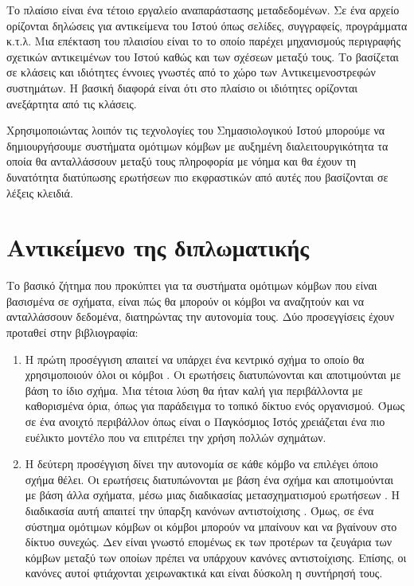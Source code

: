 Το πλαίσιο  είναι ένα τέτοιο εργαλείο αναπαράστασης
μεταδεδομένων. Σε ένα  αρχείο ορίζονται δηλώσεις για
αντικείμενα του Ιστού όπως σελίδες, συγγραφείς, προγράμματα κ.τ.λ.
Μια επέκταση του πλαισίου  είναι το  το
οποίο παρέχει μηχανισμούς περιγραφής σχετικών αντικειμένων του
Ιστού καθώς και των σχέσεων μεταξύ τους. Το 
βασίζεται σε κλάσεις και ιδιότητες έννοιες γνωστές από το χώρο των
Αντικειμενοστρεφών συστημάτων. Η βασική διαφορά είναι ότι στο
πλαίσιο  οι ιδιότητες ορίζονται ανεξάρτητα από τις
κλάσεις.

Χρησιμοποιώντας λοιπόν τις τεχνολογίες του Σημασιολογικού Ιστού
μπορούμε να δημιουργήσουμε συστήματα ομότιμων κόμβων με αυξημένη
διαλειτουργικότητα τα οποία θα ανταλλάσσουν μεταξύ τους πληροφορία
με νόημα και θα έχουν τη δυνατότητα διατύπωσης ερωτήσεων πιο
εκφραστικών από αυτές που βασίζονται σε λέξεις κλειδιά.


\section{Αντικείμενο της διπλωματικής}
Το βασικό ζήτημα που προκύπτει για τα συστήματα ομότιμων κόμβων
που είναι βασισμένα σε σχήματα, είναι πώς θα μπορούν οι κόμβοι να
αναζητούν και να ανταλλάσσουν δεδομένα, διατηρώντας την αυτονομία
τους. Δύο προσεγγίσεις έχουν προταθεί στην βιβλιογραφία:
\begin{enumerate}
\item Η πρώτη προσέγγιση απαιτεί να υπάρχει ένα κεντρικό σχήμα το
οποίο θα χρησιμοποιούν όλοι οι κόμβοι \cite{LaTeXProject}. Οι
ερωτήσεις διατυπώνονται και αποτιμούνται με βάση το ίδιο σχήμα.
Μια τέτοια λύση θα ήταν καλή για περιβάλλοντα με καθορισμένα όρια,
όπως για παράδειγμα το τοπικό δίκτυο ενός οργανισμού. Όμως σε ένα
ανοιχτό περιβάλλον όπως είναι ο Παγκόσμιος Ιστός χρειάζεται ένα
πιο ευέλικτο μοντέλο που να επιτρέπει την χρήση πολλών σχημάτων.
\item Η δεύτερη προσέγγιση δίνει την αυτονομία σε κάθε κόμβο να επιλέγει όποιο σχήμα θέλει.
Οι ερωτήσεις διατυπώνονται με βάση ένα σχήμα και αποτιμούνται με
βάση άλλα σχήματα, μέσω μιας διαδικασίας μετασχηματισμού ερωτήσεων
. Η διαδικασία αυτή απαιτεί την ύπαρξη
κανόνων αντιστοίχισης  \cite{greekbook}. Όμως, σε
ένα σύστημα ομότιμων κόμβων οι κόμβοι μπορούν να μπαίνουν και να
βγαίνουν στο δίκτυο συνεχώς. Δεν είναι γνωστό επομένως εκ των
προτέρων τα ζευγάρια των κόμβων μεταξύ των οποίων πρέπει να
υπάρχουν κανόνες αντιστοίχισης. Επίσης, οι κανόνες αυτοί
φτιάχονται χειρωνακτικά και είναι δύσκολη η συντήρησή τους.
\end{enumerate}


